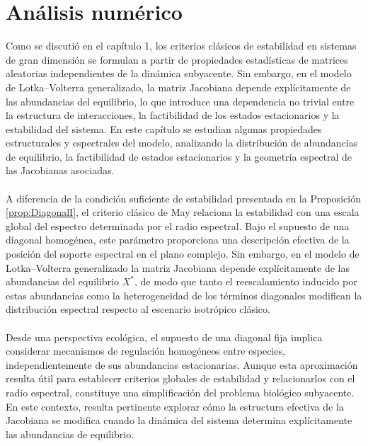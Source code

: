 \newpage
\section{Análisis numérico}

\setlength{\parindent}{0cm} Como se discutió en el capítulo 1, los criterios clásicos de estabilidad en sistemas de gran dimensión se formulan a partir de propiedades estadísticas de matrices aleatorias independientes de la dinámica subyacente. Sin embargo, en el modelo de Lotka--Volterra generalizado, la matriz Jacobiana depende explícitamente de las abundancias del equilibrio, lo que introduce una dependencia no trivial entre la estructura de interacciones, la factibilidad de los estados estacionarios y la estabilidad del sistema. En este capítulo se estudian algunas propiedades estructurales y espectrales del modelo, analizando la distribución de abundancias de equilibrio, la factibilidad de estados estacionarios y la geometría espectral de las Jacobianas asociadas.\\
\\
A diferencia de la condición suficiente de estabilidad presentada en la Proposición \ref{prop:DiagonalI}, el criterio clásico de May relaciona la estabilidad con una escala global del espectro determinada por el radio espectral. Bajo el supuesto de una diagonal homogénea, este parámetro proporciona una descripción efectiva de la posición del soporte espectral en el plano complejo. Sin embargo, en el modelo de Lotka–Volterra generalizado la matriz Jacobiana depende explícitamente de las abundancias del equilibrio $X^*$, de modo que tanto el reescalamiento inducido por estas abundancias como la heterogeneidad de los términos diagonales modifican la distribución espectral respecto al escenario isotrópico clásico. \\
\\
Desde una perspectiva ecológica, el supuesto de una diagonal fija implica considerar mecanismos de regulación homogéneos entre especies, independientemente de sus abundancias estacionarias. Aunque esta aproximación resulta útil para establecer criterios globales de estabilidad y relacionarlos con el radio espectral, constituye una simplificación del problema biológico subyacente. En este contexto, resulta pertinente explorar cómo la estructura efectiva de la Jacobiana se modifica cuando la dinámica del sistema determina explícitamente las abundancias de equilibrio.


